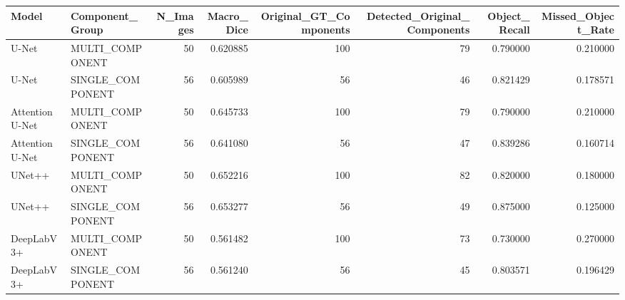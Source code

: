 \begin{tabular}{llrrrrrr}
\toprule
Model & Component_Group & N_Images & Macro_Dice & Original_GT_Components & Detected_Original_Components & Object_Recall & Missed_Object_Rate \\
\midrule
U-Net & MULTI_COMPONENT & 50 & 0.620885 & 100 & 79 & 0.790000 & 0.210000 \\
U-Net & SINGLE_COMPONENT & 56 & 0.605989 & 56 & 46 & 0.821429 & 0.178571 \\
Attention U-Net & MULTI_COMPONENT & 50 & 0.645733 & 100 & 79 & 0.790000 & 0.210000 \\
Attention U-Net & SINGLE_COMPONENT & 56 & 0.641080 & 56 & 47 & 0.839286 & 0.160714 \\
UNet++ & MULTI_COMPONENT & 50 & 0.652216 & 100 & 82 & 0.820000 & 0.180000 \\
UNet++ & SINGLE_COMPONENT & 56 & 0.653277 & 56 & 49 & 0.875000 & 0.125000 \\
DeepLabV3+ & MULTI_COMPONENT & 50 & 0.561482 & 100 & 73 & 0.730000 & 0.270000 \\
DeepLabV3+ & SINGLE_COMPONENT & 56 & 0.561240 & 56 & 45 & 0.803571 & 0.196429 \\
\bottomrule
\end{tabular}
